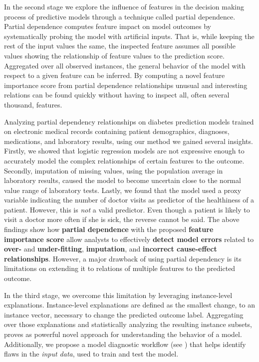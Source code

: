 In the second stage we explore the influence of features in the decision making process of predictive models through a technique called partial dependence. Partial dependence computes feature impact on model outcomes by systematically probing the model with artificial inputs. That is, while keeping the rest of the input values the same, the inspected feature assumes all possible values showing the relationship of feature values to the prediction score. Aggregated over all observed instances, the general behavior of the model with respect to a given feature can be inferred. By computing a novel feature importance score from partial dependence relationships unusual and interesting relations can be found quickly without having to inspect all, often several thousand, features.

Analyzing partial dependency relationships on diabetes prediction models trained on electronic medical records containing patient demographics, diagnoses, medications, and laboratory results, using our method we gained several insights. Firstly, we showed that logistic regression models are not expressive enough to accurately model the complex relationships of certain features to the outcome. Secondly, imputation of missing values, using the population average in laboratory results, caused the model to become uncertain close to the normal value range of laboratory tests. Lastly, we found that the model used a proxy variable indicating the number of doctor visits as predictor of the healthiness of a patient. However, this is \emph{not} a valid predictor. Even though a patient is likely to visit a doctor more often if she is sick, the reverse cannot be said. The above findings show how \textbf{partial dependence} with the proposed \textbf{feature importance score} allow analysts to effectively \textbf{detect model errors} related to \textbf{over-} and \textbf{under-fitting}, \textbf{imputation}, and \textbf{incorrect cause-effect relationships}.
However, a major drawback of using partial dependency is its limitations on extending it to relations of multiple features to the predicted outcome.



In the third stage, we overcome this limitation by leveraging instance-level explanations. Instance-level explanations are defined as the smallest change, to an instance vector, necessary to change the predicted outcome label. Aggregating over those explanations and statistically analyzing the resulting instance subsets, proves as powerful novel approach for understanding the behavior of a model. Additionally, we propose a model diagnostic workflow (see ) that helps identify flaws in the \emph{input data}, used to train and test the model.

